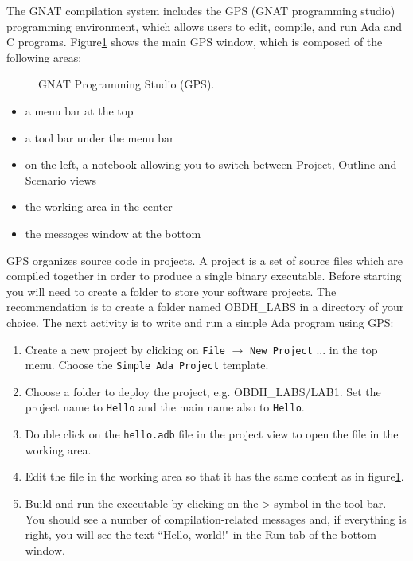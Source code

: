 The GNAT compilation system includes the GPS (GNAT programming studio) programming environment, which allows users to edit, compile, and run Ada and C programs. Figure\ref{fig:gps} shows the main GPS window, which is composed of the following areas:

\begin{figure}[h]
            \caption{GNAT Programming Studio (GPS).}
            \label{fig:gps}
\end{figure}

\begin{itemize}
\item	a menu bar at the top
\item	a tool bar under the menu bar
\item	on the left, a notebook allowing you to switch between Project, Outline and Scenario views
\item	the working area in the center
\item	the messages window at the bottom
\end{itemize}

GPS organizes source code in projects. A project is a set of source files which are compiled together in order to produce a single binary executable. 
Before starting you will need to create a folder to store your software projects. The recommendation is to create a folder named OBDH\_LABS in a directory of your choice.
The next activity is to write and run a simple Ada program using GPS:
\begin{enumerate}
\item 	Create a new project by clicking on {\tt File} $\rightarrow$ {\tt New Project} ... in the top menu. Choose the {\tt Simple Ada Project} template.
\item	Choose a folder to deploy the project, e.g. OBDH\_LABS/LAB1. Set the project name to {\tt Hello} and the main name also to {\tt Hello}.
\item	Double click on the {\tt hello.adb} file in the project view to open the file in the working area. 
\item	Edit the file in the working area so that it has the same content as in figure\ref{fig:gps}.
\item	Build and run the executable by clicking on the $\rhd$ symbol in the tool bar. You should see a number of compilation-related messages and, if everything is right, you will see the text ``Hello, world!" in the Run tab of the bottom window.
\end{enumerate}


